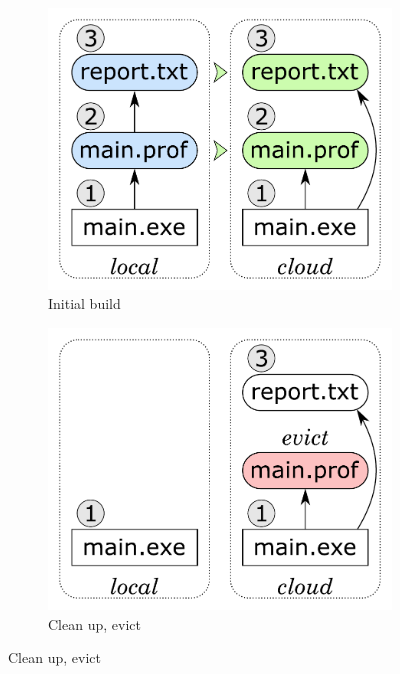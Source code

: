 \begin{figure}
\begin{subfigure}[b]{0.31\linewidth}
\centerline{\includegraphics[scale=0.26]{fig/frankenbuild-example-build.pdf}}
\caption{Initial build}
\end{subfigure}
\begin{subfigure}[b]{0.31\linewidth}
\centerline{\includegraphics[scale=0.26]{fig/frankenbuild-example-clean.pdf}}
\caption{Clean up, evict }

\end{subfigure}
\end{figure}
